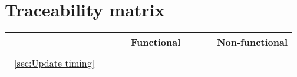 \documentclass[12pt]{article}
\renewcommand{\c}{\checkmark}
\newcommand{\s}[1] {\begin{sideways}#1\end{sideways}}
\begin{document}
\section{Traceability matrix}
\begin{center}
\begin{tabular}{|l||*{12}{c|}|*{4}{c|}}
\hline
\multicolumn{1}{|c||}{ }&
\multicolumn{12}{|c||}{Functional} &
\multicolumn{4}{|c|}{Non-functional}\\
\hline
	& \s{} & \\
\hline
\hline
~\ref{sec:Update timing}	&	\c \\
\hline
\end{tabular}
\end{center}
\end{document}
